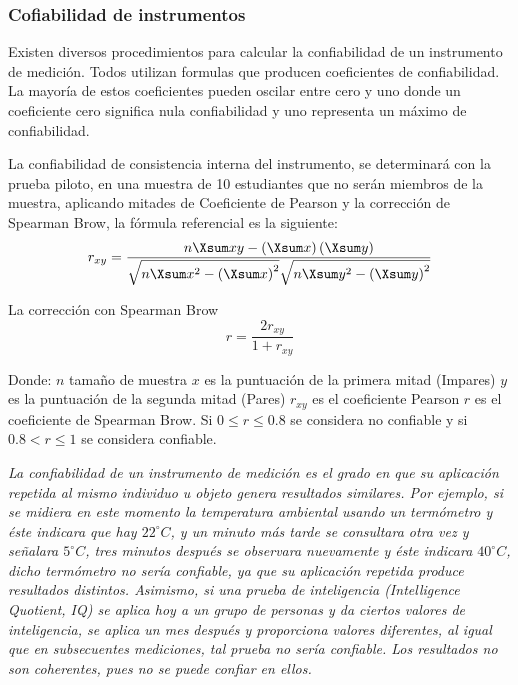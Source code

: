 \documentclass[12pt,a4paper]{article}
\begin{document}
\subsubsection{Cofiabilidad de instrumentos}

Existen  diversos procedimientos para calcular la confiabilidad de un instrumento de medición. Todos utilizan formulas que producen coeficientes de confiabilidad. La mayoría de estos coeficientes pueden oscilar entre cero y uno donde un coeficiente cero significa nula confiabilidad y uno representa  un máximo de confiabilidad.

La confiabilidad de consistencia interna del instrumento, se determinará con la prueba piloto, en una muestra de 10 estudiantes que no serán miembros de la muestra, aplicando mitades de Coeficiente de Pearson y la corrección de Spearman Brow, la fórmula referencial es la siguiente: $$r_{xy}=\frac{n\Xsum xy-\cc{\Xsum x}\cc{\Xsum y}}{\sqrt{n\Xsum x^2-\cc{\Xsum x}^2}\sqrt{n\Xsum y^2-\cc{\Xsum y}^2}}$$

La corrección con Spearman Brow $$r=\frac{2r_{xy}}{1+r_{xy}}$$

Donde:
$n$ tamaño de muestra
$x$ es la puntuación de la primera mitad (Impares)
$y$ es la puntuación de la segunda mitad (Pares)
$r_{xy}$ es el coeficiente Pearson
$r$ es el coeficiente de Spearman Brow. Si $0\leq r\leq 0.8$ se considera no confiable y si $0.8< r \leq1$ se considera confiable.

\begin{displayquote}
	\emph{La confiabilidad de un instrumento de medición es el grado en que su aplicación
		repetida al mismo individuo u objeto genera resultados similares. Por ejemplo, si se midiera en este momento la temperatura ambiental usando un termómetro y éste indicara que hay $22^\circ C$, y un minuto más tarde se consultara otra vez y señalara $5^\circ C$, tres minutos después se observara nuevamente y éste indicara $40^\circ C$, dicho termómetro no sería confiable, ya que su aplicación repetida produce resultados distintos. Asimismo, si una prueba de inteligencia (Intelligence Quotient, IQ) se aplica hoy a un grupo de personas y da ciertos valores de inteligencia, se aplica un mes después y proporciona valores diferentes, al igual que en subsecuentes mediciones, tal prueba no sería confiable. Los resultados no son coherentes, pues no se puede confiar en ellos.
	} \cite[p.~61]{kothari_research_2004}\end{displayquote}
\end{document}
